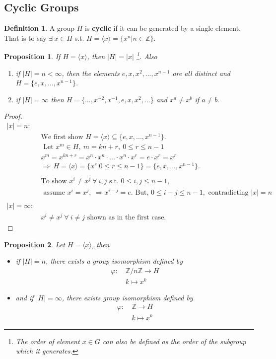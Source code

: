\documentclass{article}
\newtheorem{theorem}{Proposition}[section]
\theoremstyle{definition}
\newtheorem{definition}{Definition}[section]
\theoremstyle{remark}
\begin{document}
\subsection{Cyclic Groups}
\begin{definition}
A group $H$ is \textbf{cyclic} if it can be generated by a single element. That is to say $\exists~ x\in H$ s.t. $H=\langle x\rangle=\lbrace x^n|n\in \mathbb{Z}\rbrace$.\\
\end{definition}
\begin{theorem}
If  $H=\langle x\rangle$, then $|H|=|x|$  \footnote{The order of element $x\in G$ can also be defined as the order of the subgroup which it generates.}. Also
\begin{enumerate}
\item if $|H|=n<\infty$, then the elements $e,x,x^2,...,x^{n-1}$ are all distinct and $H=\lbrace e,x,...,x^{n-1}\rbrace$.
\item if $|H|=\infty$ then $H=\lbrace ...,x^{-2},x^{-1},e,x,x^2,...\rbrace$ and $x^a\neq x^b$ if $a\neq b$. \\
\end{enumerate}
\end{theorem}
\begin{proof}
\begin{align*}
|x|=n:~&\\
& \text{We first show }H=\langle x \rangle\subseteq\lbrace e,x,...,x^{n-1}\rbrace.\\
&\text{ Let } x^m\in H,~m=kn+r, ~0\leq r\leq n-1\\
&x^m=x^{kn+r}=x^n\cdot x^n \cdot ... \cdot x^n \cdot x^r = e\cdot x^r=x^r\\
&\Rightarrow ~ H=\langle x\rangle=\lbrace x^r|0\leq r\leq n-1\rbrace=\lbrace e,x,...,x^{n-1}\rbrace.\\
&~\\
&\text{To show } x^i\neq x^j~\forall~i,j\text{ s.t. }0\leq i,j\leq n-1,\\
&\text{ assume } x^i=x^j,~\Rightarrow x^{i-j}=e. \text{ But, }0\leq i-j\leq n-1,\text{ contradicting } |x|=n\\
&~\\
|x|=\infty:~&\\
&x^i\neq x^j~\forall~ i\neq j\text{ shown as in the first case.}
\end{align*}
\end{proof}
\begin{theorem}
Let $H=\langle x\rangle$, then
\begin{itemize}
\item if $|H|=n$, there exists a group isomorphism defined by
\begin{align}
\varphi:~ &\mathbb{Z}/n\mathbb{Z}\rightarrow H\\
			  &k\mapsto x^k
\end{align}
\item and if $|H|=\infty$, there exists group isomorphism defined by
\begin{align*}
\varphi:~&\mathbb{Z}\rightarrow H\\
&k\mapsto x^k
\end{align*}
\end{itemize}
\end{theorem}
\end{document}
